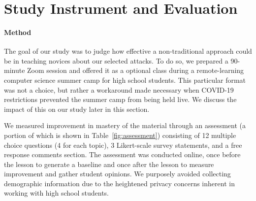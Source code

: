 \section{Study Instrument and Evaluation}
\label{SEC:evaluation}

\paragraph{Method}The goal of our study was to judge how effective a non-traditional approach
could be in teaching novices about our selected attacks. To do so, we prepared a 90-minute Zoom session and offered it as a optional class during
a remote-learning computer science summer camp for high school
students. This particular format was not a choice, but rather a workaround made necessary when COVID-19 restrictions prevented the summer camp from being held live. We discuss the impact of this on our study later in this section.


We measured improvement in mastery
of the material
through
an  assessment (a portion of which is shown in Table~\ref{fig:assessment})
consisting of
12 multiple choice questions (4 for each topic),
3 Likert-scale survey statements,
and a free response comments section.
The assessment was conducted
online, once before the lesson to
generate a baseline and once after the lesson to measure improvement
and gather student opinions.  We purposely avoided collecting demographic information
due to the heightened privacy concerns inherent in working with high school students.








